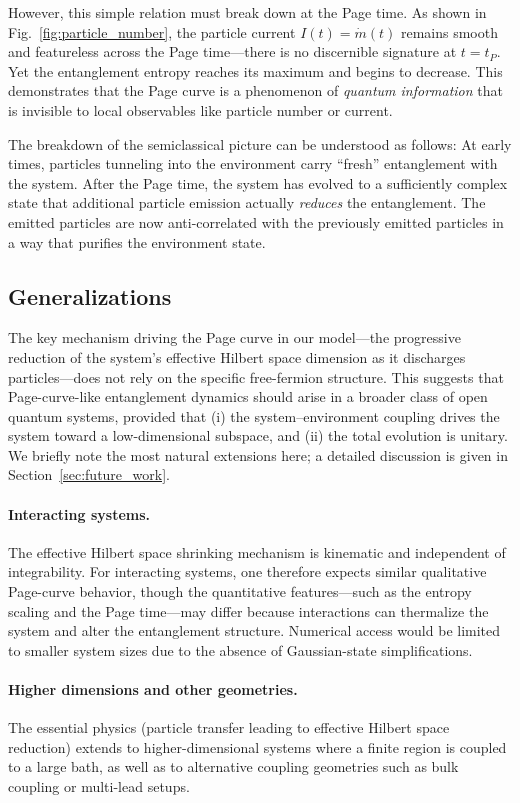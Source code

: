 \documentclass[12pt,oneside,openright]{report}
\theoremstyle{definition}
\theoremstyle{plain}
\theoremstyle{remark}
\begin{document}
However, this simple relation must break down at the Page time. As shown in Fig.~\ref{fig:particle_number}, the particle current $I(t) = \dot{m}(t)$ remains smooth and featureless across the Page time---there is no discernible signature at $t = t_P$. Yet the entanglement entropy reaches its maximum and begins to decrease. This demonstrates that the Page curve is a phenomenon of \emph{quantum information} that is invisible to local observables like particle number or current.

The breakdown of the semiclassical picture can be understood as follows: At early times, particles tunneling into the environment carry ``fresh'' entanglement with the system. After the Page time, the system has evolved to a sufficiently complex state that additional particle emission actually \emph{reduces} the entanglement. The emitted particles are now anti-correlated with the previously emitted particles in a way that purifies the environment state.

\subsection{Generalizations}
The key mechanism driving the Page curve in our model---the progressive reduction of the system's effective Hilbert space dimension as it discharges particles---does not rely on the specific free-fermion structure. This suggests that Page-curve-like entanglement dynamics should arise in a broader class of open quantum systems, provided that
(i) the system--environment coupling drives the system toward a low-dimensional subspace, and
(ii) the total evolution is unitary.
We briefly note the most natural extensions here; a detailed discussion is given in Section~\ref{sec:future_work}.

\paragraph{Interacting systems.} The effective Hilbert space shrinking mechanism is kinematic and independent of integrability. For interacting systems, one therefore expects similar qualitative Page-curve behavior, though the quantitative features---such as the entropy scaling and the Page time---may differ because interactions can thermalize the system and alter the entanglement structure. Numerical access would be limited to smaller system sizes due to the absence of Gaussian-state simplifications.

\paragraph{Higher dimensions and other geometries.} The essential physics (particle transfer leading to effective Hilbert space reduction) extends to higher-dimensional systems where a finite region is coupled to a large bath, as well as to alternative coupling geometries such as bulk coupling or multi-lead setups.
\end{document}
